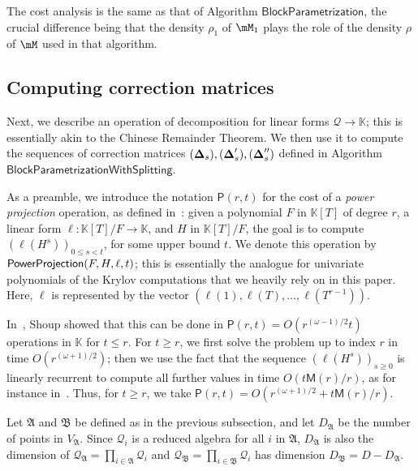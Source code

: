 \documentclass[12pt]{article}
\newcommand{\mat}[1]{\bm{\MakeUppercase{#1}}} %
\newcommand{\mainalgoname}{\mathsf{ BlockParametrization}}
\newcommand{\residueI}{\mathscr{Q}}
\def\M {\ensuremath{\mathsf{M}}}
\def\PP {\ensuremath{\mathsf{P}}}
\def\K{\mathbb{K}}
\def\K {\ensuremath{\mathbb{K}}}
\begin{document}
The cost analysis is the same as that of Algorithm $\mainalgoname$, the
crucial difference being that the density $\rho_1$ of $\mM_1$ plays the 
role of the density $\rho$ of $\mM$ used in that algorithm.


\subsection{Computing correction matrices}

Next, we describe an operation of decomposition for linear forms
$\residueI \to \K$; this is essentially akin to the Chinese Remainder
Theorem. We then use it to compute the sequences of correction
matrices $(\mat{\Delta}_s),(\mat{\Delta}'_s),(\mat{\Delta}''_s)$
defined in Algorithm $\mathsf{BlockParametrizationWithSplitting}$.

As a preamble, we introduce the notation $\PP(r,t)$ for the cost of a
{\em power projection} operation, as defined
in~\cite{Shoup94,Shoup99}: given a polynomial $F$ in $\K[T]$ of degree
$r$, a linear form $\ell: \K[T]/F \to \K$, and $H$ in $\K[T]/F$, the
goal is to compute $(\ell(H^s))_{0 \le s < t}$, for some upper bound
$t$. We denote this operation by ${\sf PowerProjection}(F,H,\ell,t)$; this is
essentially the analogue for univariate polynomials of the Krylov
computations that we heavily rely on in this paper. Here, $\ell$ 
is represented by the vector $(\ell(1),\ell(T),\dots,\ell(T^{r-1}))$.

In~\cite[Theorem~4]{Shoup94}, Shoup showed that this can be done in
$\PP(r,t)=O(r^{(\omega-1)/2} t)$ operations in $\K$ for $t \le r$. For
$t \ge r$, we first solve the problem up to index $r$ in time
$O(r^{(\omega+1)/2})$; then we use the fact that the sequence 
$(\ell(H^s))_{s \ge 0}$
 is linearly recurrent to compute all further values in time
 $O(t\M(r)/r)$, as for instance in~\cite[Proposition~1]{BoFlSaSc06}.
Thus, for $t \ge r$, we take $\PP(r,t)=O(r^{(\omega+1)/2} +
t\M(r)/r)$.

\medskip

Let $\mathfrak{A}$ and $\mathfrak{B}$ be defined as in the previous 
subsection, and let $D_{\mathfrak{A}}$ be the number of points in
$V_{\mathfrak{A}}$. Since $\residueI_i$ is a reduced algebra for all
$i$ in $\mathfrak{A}$, $D_\mathfrak{A}$ is also the dimension of
$\residueI_\mathfrak{A} = \prod_{i \in \mathfrak{A}}
\residueI_i$ and $\residueI_\mathfrak{B}=\prod_{i \in \mathfrak{B}}
\residueI_i$ has dimension $D_{\mathfrak{B}}=D-D_{\mathfrak{A}}$.
\end{document}
